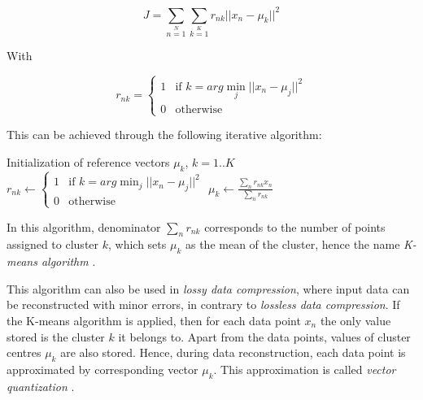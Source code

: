 \begin{equation}
J = \sum\limits_{n=1}\limits^{N} \sum\limits_{k=1}\limits^{K} r_{nk} ||x_n - \mu_k||^2
\label{distort_fc}
\end{equation}

\noindent With

\begin{equation*}
r_{nk} = \left\{
	\begin{array}{ll}
		1 & \mbox{if }  k = arg \min_j ||x_n - \mu_j||^2 \\
		0 & \mbox{otherwise}
	\end{array}
\right.
\end{equation*}
\vspace{\baselineskip}

\noindent This can be achieved through the following iterative algorithm:
\newline

\begin{algorithmic}
\State Initialization of reference vectors $\mu_k$, $k = 1..K$ 
\Repeat	
		\State \begin{math} 
			r_{nk} \gets \left\{
			\begin{array}{ll}
				1 & \mbox{if }  k = arg \min_j ||x_n - \mu_j||^2 \\
				0 & \mbox{otherwise}
			\end{array}
			\right.
			\end{math}
	\EndFor
		\State $\mu_k \gets \frac{\sum\limits_n r_{nk}x_n}{\sum\limits_n r_{nk}}$
	\EndFor
{}
\end{algorithmic}

\vspace{\baselineskip}

\noindent In this algorithm, denominator $\sum\limits_n r_{nk}$ corresponds to the number of points assigned to cluster $k$, which sets $\mu_k$ as the mean of the cluster, hence the name \textit{K-means algorithm} \cite{BIS06}.
\newline

\noindent This algorithm can also be used in \textit{lossy data compression}, where input data can be reconstructed with minor errors, in contrary to \textit{lossless data compression}. If the K-means algorithm is applied, then for each data point $x_n$ the only value stored is the cluster $k$ it belongs to. Apart from the data points, values of cluster centres $\mu_k$ are also stored. Hence, during data reconstruction, each data point is approximated by corresponding vector $\mu_k$. This approximation is called \textit{vector quantization} \cite{BIS06}.
\newline

